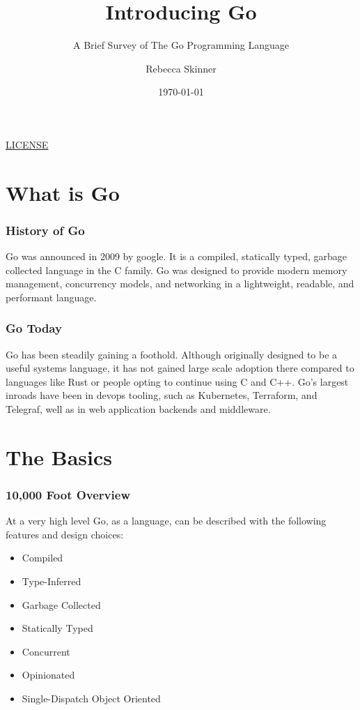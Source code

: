 \documentclass{beamer}
\title{Introducing Go}
\subtitle{A Brief Survey of The Go Programming Language}
\author{Rebecca Skinner}
\institute{Rackspace Hosting}
\date{\today}
\newcommand{\chref}[3] {
  {\color{#1} \href{#2}{\underline{#3}}}
}
\begin{document}
\begin{frame}
  \titlepage{}
  \begin{center}
    \small{\chref{blue}{http://creativecommons.org/licenses/by-sa/4.0/}{LICENSE}}
  \end{center}
\end{frame}

\section{What is Go}

\begin{frame}
  \frametitle{History of Go}
  Go was announced in 2009 by google.  It is a compiled, statically
  typed, garbage collected language in the C family.  Go was designed
  to provide modern memory management, concurrency models, and
  networking in a lightweight, readable, and performant language.
\end{frame}

\begin{frame}
  \frametitle{Go Today}
  Go has been steadily gaining a foothold.  Although originally
  designed to be a useful systems language, it has not gained large
  scale adoption there compared to languages like Rust or people
  opting to continue using C and C++.  Go's largest inroads have been
  in devops tooling, such as Kubernetes, Terraform, and Telegraf,
  well as in web application backends and middleware.
\end{frame}

\section{The Basics}

\begin{frame}
  \frametitle{10,000 Foot Overview}
  At a very high level Go, as a language, can be described with the
  following features and design choices:
  \begin{itemize}
  \item Compiled
  \item Type-Inferred
  \item Garbage Collected
  \item Statically Typed
  \item Concurrent
  \item Opinionated
  \item Single-Dispatch Object Oriented
  \end{itemize}
\end{frame}
\end{document}
